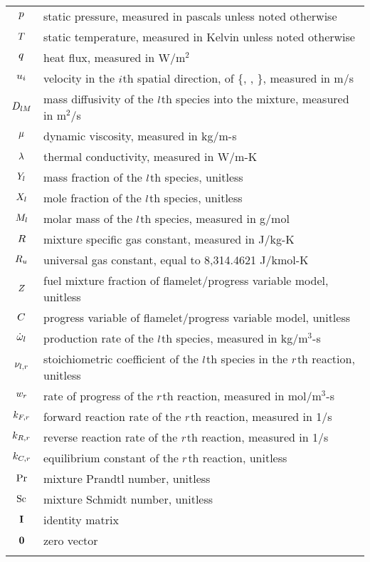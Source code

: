\begin{longtable}{cp{}}
	$p$ & static pressure, measured in pascals unless noted otherwise \\
	$T$ & static temperature, measured in Kelvin unless noted otherwise \\
	$q$ & heat flux, measured in W/m$^2$ \\
	$u_{i}$ & velocity in the $i$th spatial direction, of \{\velX, \velY, \velZ\}, measured in m/s \\
	$D_{l M}$ & mass diffusivity of the $l$th species into the mixture, measured in m$^2$/s \\
	$\mu$ & dynamic viscosity, measured in kg/m-s \\
	$\lambda$ & thermal conductivity, measured in W/m-K \\
	$Y_{l}$ & mass fraction of the $l$th species, unitless \\
	$X_{l}$ & mole fraction of the $l$th species, unitless \\
	$M_{l}$ & molar mass of the $l$th species, measured in g/mol \\
	$R$ & mixture specific gas constant, measured in J/kg-K \\
	$R_u$ & universal gas constant, equal to 8,314.4621 J/kmol-K \\
	$Z$ & fuel mixture fraction of flamelet/progress variable model, unitless \\
	$C$ & progress variable of flamelet/progress variable model, unitless \\
	$\dot{\omega}_{l}$ & production rate of the $l$th species, measured in kg/m$^3$-s \\
	$\nu_{l,r}$ & stoichiometric coefficient of the $l$th species in the $r$th reaction, unitless \\
	$w_{r}$ & rate of progress of the $r$th reaction, measured in mol/m$^3$-s \\
	$k_{F,r}$ & forward reaction rate of the $r$th reaction, measured in 1/s  \\
	$k_{R,r}$ & reverse reaction rate of the $r$th reaction, measured in 1/s \\
	$k_{C,r}$ & equilibrium constant of the $r$th reaction, unitless \\
	$\text{Pr}$ & mixture Prandtl number, unitless \\
	$\text{Sc}$ & mixture Schmidt number, unitless \\
	$\mathbf{I}$ & identity matrix \\
	$\mathbf{0}$ & zero vector \\
	 &  \\
\end{longtable}